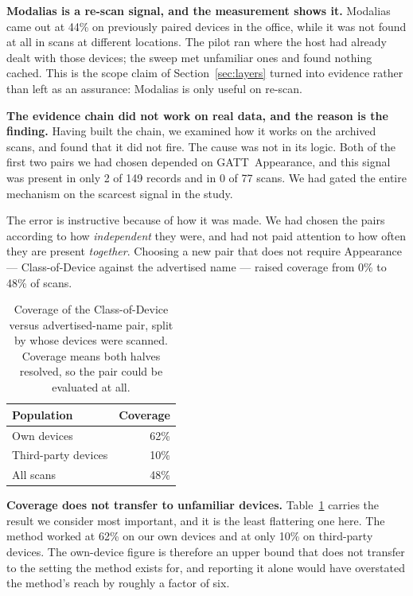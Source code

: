 \documentclass[conference]{IEEEtran}
\begin{document}
\textbf{Modalias is a re-scan signal, and the measurement shows it.} Modalias
came out at 44\% on previously paired devices in the office, while it was not
found at all in scans at different locations. The pilot ran where the host had
already dealt with those devices; the sweep met unfamiliar ones and found
nothing cached. This is the scope claim of Section~\ref{sec:layers} turned
into evidence rather than left as an assurance: Modalias is only useful on
re-scan.

\textbf{The evidence chain did not work on real data, and the reason is the
finding.} Having built the chain, we examined how it works on the archived
scans, and found that it did not fire. The cause was not in its logic. Both of
the first two pairs we had chosen depended on GATT~Appearance, and this signal
was present in only 2 of 149 records and in 0 of 77 scans. We had gated the
entire mechanism on the scarcest signal in the study.

The error is instructive because of how it was made. We had chosen the pairs
according to how \emph{independent} they were, and had not paid attention to
how often they are present \emph{together}. Choosing a new pair that does not
require Appearance --- Class-of-Device against the advertised name --- raised
coverage from 0\% to 48\% of scans.

\begin{table}[t]
\centering
\footnotesize
\setlength{\tabcolsep}{5pt}
\renewcommand{\arraystretch}{1.15}
\caption{Coverage of the Class-of-Device versus advertised-name pair, split by
whose devices were scanned. Coverage means both halves resolved, so the pair
could be evaluated at all.}
\label{tab:pairsplit}
\begin{tabular}{@{}>{\raggedright\arraybackslash}p{4.2cm} r@{}}
\toprule
\textbf{Population} & \textbf{Coverage} \\
\midrule
Own devices & 62\% \\
Third-party devices & 10\% \\
\midrule
All scans & 48\% \\
\bottomrule
\end{tabular}
\end{table}

\textbf{Coverage does not transfer to unfamiliar devices.}
Table~\ref{tab:pairsplit} carries the result we consider most important, and
it is the least flattering one here. The method worked at 62\% on our own
devices and at only 10\% on third-party devices. The own-device figure is
therefore an upper bound that does not transfer to the setting the method
exists for, and reporting it alone would have overstated the method's reach by
roughly a factor of six.
\end{document}
